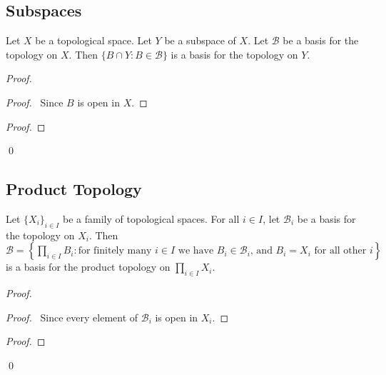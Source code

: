 \subsection{Subspaces}

\begin{prop}
\label{prop:basis_subspace}
Let $X$ be a topological space. Let $Y$ be a subspace of $X$. Let $\mathcal{B}$ be a basis for the topology on $X$. Then $\{ B \cap Y : B \in \mathcal{B} \}$ is a basis for the topology on $Y$.
\end{prop}

\begin{proof}
\pf
{}
\begin{proof}
	\pf\ Since $B$ is open in $X$.
\end{proof}
\begin{proof}
\end{proof}
\qed
\end{proof}

\subsection{Product Topology}

\begin{prop}
Let $\{X_i\}_{i \in I}$ be a family of topological spaces. For all $i \in I$, let $\mathcal{B}_i$ be a basis for the topology on $X_i$. Then $\mathcal{B} = \left\{ \prod_{i \in I} B_i : \text{for finitely many $i \in I$ we have $B_i \in \mathcal{B}_i$, and $B_i = X_i$ for all other $i$} \right\}$ is a basis for the product topology on $\prod_{i \in I} X_i$.
\end{prop}

\begin{proof}
\pf
{}
\begin{proof}
	\pf\ Since every element of $\mathcal{B}_i$ is open in $X_i$.
\end{proof}
\begin{proof}
\end{proof}
\qed
\end{proof}

